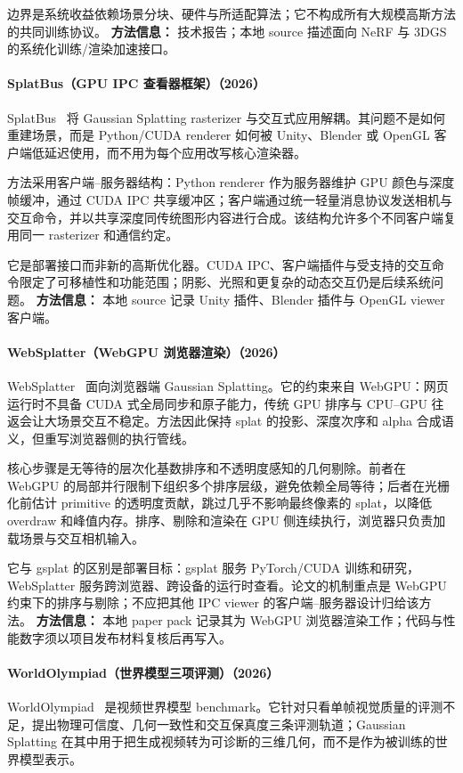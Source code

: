 边界是系统收益依赖场景分块、硬件与所适配算法；它不构成所有大规模高斯方法的共同训练协议。
\textbf{方法信息：} 技术报告；本地 source 描述面向 NeRF 与 3DGS 的系统化训练/渲染加速接口。
\paragraph{SplatBus（GPU IPC 查看器框架）（2026）}
SplatBus~\cite{2601_15431} 将 Gaussian Splatting rasterizer 与交互式应用解耦。其问题不是如何重建场景，而是 Python/CUDA renderer 如何被 Unity、Blender 或 OpenGL 客户端低延迟使用，而不用为每个应用改写核心渲染器。

方法采用客户端--服务器结构：Python renderer 作为服务器维护 GPU 颜色与深度帧缓冲，通过 CUDA IPC 共享缓冲区；客户端通过统一轻量消息协议发送相机与交互命令，并以共享深度同传统图形内容进行合成。该结构允许多个不同客户端复用同一 rasterizer 和通信约定。

它是部署接口而非新的高斯优化器。CUDA IPC、客户端插件与受支持的交互命令限定了可移植性和功能范围；阴影、光照和更复杂的动态交互仍是后续系统问题。
\textbf{方法信息：} 本地 source 记录 Unity 插件、Blender 插件与 OpenGL viewer 客户端。
\paragraph{WebSplatter（WebGPU 浏览器渲染）（2026）}
WebSplatter~\cite{2602_03207} 面向浏览器端 Gaussian Splatting。它的约束来自 WebGPU：网页运行时不具备 CUDA 式全局同步和原子能力，传统 GPU 排序与 CPU--GPU 往返会让大场景交互不稳定。方法因此保持 splat 的投影、深度次序和 alpha 合成语义，但重写浏览器侧的执行管线。

核心步骤是无等待的层次化基数排序和不透明度感知的几何剔除。前者在 WebGPU 的局部并行限制下组织多个排序层级，避免依赖全局等待；后者在光栅化前估计 primitive 的透明度贡献，跳过几乎不影响最终像素的 splat，以降低 overdraw 和峰值内存。排序、剔除和渲染在 GPU 侧连续执行，浏览器只负责加载场景与交互相机输入。

它与 gsplat 的区别是部署目标：gsplat 服务 PyTorch/CUDA 训练和研究，WebSplatter 服务跨浏览器、跨设备的运行时查看。论文的机制重点是 WebGPU 约束下的排序与剔除；不应把其他 IPC viewer 的客户端--服务器设计归给该方法。
\textbf{方法信息：} 本地 paper pack 记录其为 WebGPU 浏览器渲染工作；代码与性能数字须以项目发布材料复核后再写入。
\paragraph{WorldOlympiad（世界模型三项评测）（2026）}
WorldOlympiad~\cite{2606_11129} 是视频世界模型 benchmark。它针对只看单帧视觉质量的评测不足，提出物理可信度、几何一致性和交互保真度三条评测轨道；Gaussian Splatting 在其中用于把生成视频转为可诊断的三维几何，而不是作为被训练的世界模型表示。

